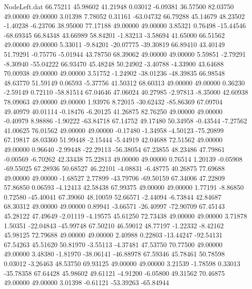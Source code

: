\begin{filecontents}{NodeLeft.dat}
  66.75211   45.98602   41.21948     0.03012   -6.09381   36.57500   82.03750   49.00000   49.00000    3.01398    7.78052    0.31161  -63.04732
  66.79288   45.14679   48.23502    -1.40238   -6.23706   38.95000   77.17188   49.00000   49.00000    3.85321    0.76498  -15.44546  -68.69345
  66.84348   43.66989   58.84201    -1.83213   -3.58694   41.65000   66.51562   49.00000   49.00000    5.33011   -9.84201  -20.07775  -39.30819
  66.89410   43.40149   51.79291    -0.75776   -5.01944   43.78750   68.39062   49.00000   49.00000    5.59851   -2.79291   -8.30940  -55.04222
  66.93470   45.48248   50.24902    -3.40788   -4.33900   43.64688   70.00938   49.00000   49.00000    3.51752   -1.24902  -38.01236  -48.39835
  66.98548   48.63770   51.59149     0.06593   -5.37756   41.50312   68.60313   49.00000   49.00000    0.36230   -2.59149    0.72110  -58.81514
  67.04646   47.06024   40.27985    -2.97813   -8.35000   42.60938   78.09063   49.00000   49.00000    1.93976    8.72015  -30.62432  -85.86369
  67.09704   49.40979   40.01114    -0.18476   -6.20125   41.26875   82.76250   49.00000   49.00000   -0.40979    8.98886   -1.90222  -63.84718
  67.14752   49.17480   50.34958    -0.43544   -7.27562   41.00625   76.01562   49.00000   49.00000   -0.17480   -1.34958   -4.50123  -75.20899
  67.19817   48.03360   51.99448    -2.15444   -5.44919   42.04688   72.51562   49.00000   49.00000    0.96640   -2.99448  -22.29113  -56.38054
  67.23855   48.23486   47.79861    -0.00569   -6.70262   42.33438   75.22813   49.00000   49.00000    0.76514    1.20139   -0.05908  -69.55025
  67.28936   50.68527   46.22101    -4.08831   -6.48775   40.26875   77.69688   49.00000   49.00000   -1.68527    2.77899  -43.79706  -69.50159
  67.34006   47.22809   57.86850     0.06593   -4.12413   42.58438   67.99375   49.00000   49.00000    1.77191   -8.86850    0.72580  -45.40041
  67.39060   48.10059   52.66571    -2.44094   -6.73844   42.84687   68.30312   49.00000   49.00000    0.89941   -3.66571  -26.40997  -72.90709
  67.45143   45.28122   47.49649    -2.01119   -4.19575   45.61250   72.73438   49.00000   49.00000    3.71878    1.50351  -22.04843  -45.99748
  67.50210   46.59012   48.77197    -1.22332   -8.42162   45.98125   72.79688   49.00000   49.00000    2.40988    0.22803  -13.44247  -92.54131
  67.54263   45.51620   50.81970    -3.55113   -4.37481   47.53750   70.77500   49.00000   49.00000    3.48380   -1.81970  -38.06141  -46.88978
  67.59346   45.78461   50.78598     0.03012   -3.26463   48.53750   69.93125   49.00000   49.00000    3.21539   -1.78598    0.33013  -35.78358
  67.64428   45.98602   49.61121    -4.91200   -6.05800   49.31562   70.46875   49.00000   49.00000    3.01398   -0.61121  -53.39263  -65.84944

\end{filecontents}
